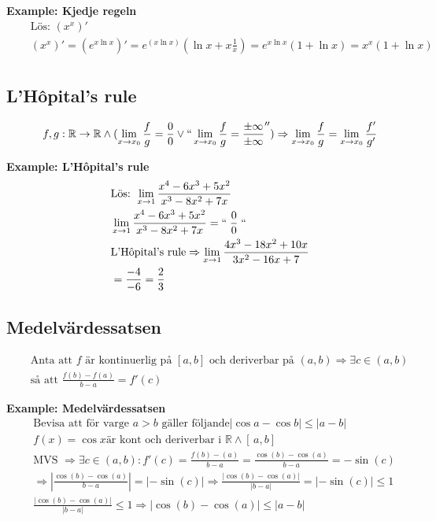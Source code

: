 \textbf{Example: Kjedje regeln}
\begin{align*}
  &\quad  \text{Lös: } (x^x)'  \\
  &\quad  (x^x)'=(e^{x\ln{x}})'=e^(x\ln{x})(\ln{x}+x\frac{1}{x})=e^{x\ln{x}}(1+\ln{x})=x^x(1+\ln{x}) \\
\end{align*}

\newpage

\subsection{L'Hôpital's rule} 
\begin{align*}
  &\quad  f,g:\mathbb{R}\to\mathbb{R} \land (\lim_{x \to x_0}\frac{f}{g}
  =\frac{0}{0}\lor ``\lim_{x\to x_0}\frac{f}{g}=\frac{\pm \infty}{\pm \infty}'')
  \Rightarrow \lim_{x \to x_0}\frac{f}{g}=\lim_{x \to x_0}\frac{f'}{g'} \\ 
\end{align*}

\textbf{Example: L'Hôpital's rule}
\begin{align*}
  &\quad  \text{Lös: } \lim_{x \to 1}\frac{x^4-6x^3+5x^2}{x^3-8x^2+7x}\\
  &\quad  \lim_{x \to 1}\frac{x^4-6x^3+5x^2}{x^3-8x^2+7x} = `` \; \frac{0}{0} \; `` \\
  &\quad  \text{L'Hôpital's rule} \Rightarrow \lim_{x \to 1}\frac{4x^3-18x^2+10x}{3x^2-16x+7} \\
  &\quad  = \frac{-4}{-6} = \frac{2}{3} \\
\end{align*}


\subsection{Medelvärdessatsen} 
\begin{align*}
  &\quad  \text{Anta att $f$ är kontinuerlig på $[a,b]$ och deriverbar på $(a,b)$}
  \Rightarrow \exists c \in (a,b) \\
  &\quad  \text{så att } \frac{f(b)-f(a)}{b-a}= f'(c)
\end{align*}

\textbf{Example: Medelvärdessatsen}
\begin{align*}
  &\quad  \text{Bevisa att för varge $a>b$ gäller följande} |\cos{a}-\cos{b}| \leq |a-b| \\
  &\quad  f(x)=\cos{x} \text{är kont och deriverbar i } \mathbb{R} \land [ \, a,b ] \, \\
  &\quad  \text{MVS }\Rightarrow \exists c \in (a,b):f'(c)=\frac{f(b)-(a)}{b-a}=
  \frac{\cos(b)-\cos(a)}{b-a}=-\sin(c) \\
  &\quad  \Rightarrow |\frac{\cos(b)-\cos(a)}{b-a}|=|-\sin(c)| \Rightarrow
  \frac{|\cos(b)-\cos(a)|}{|b-a|}=|-\sin(c)| \leq 1 \\
  &\quad  \frac{|\cos(b)-\cos(a)|}{|b-a|} \leq 1 \Rightarrow |\cos(b)-\cos(a)| \leq |a-b|
\end{align*}


